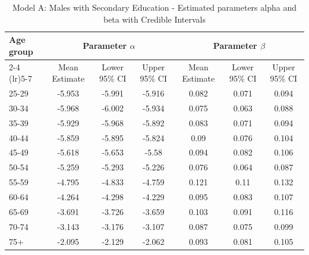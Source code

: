\begin{landscape}
\begin{table}[htbp]
\centering
\caption{Model A: Males with Secondary Education - Estimated parameters alpha and beta  with Credible Intervals}
\label{tab:parameters_ab7}
\begin{tabular}{@{}lcccccc@{}}
\toprule
Age group & \multicolumn{3}{c}{Parameter \(\alpha\)} & \multicolumn{3}{c}{Parameter \(\beta\)} \\ 
\cmidrule(lr){2-4} \cmidrule(lr){5-7}
          & Mean Estimate & Lower 95\% CI & Upper 95\% CI & Mean Estimate & Lower 95\% CI & Upper 95\% CI \\ 
\midrule
25-29 & -5.953 & -5.991 & -5.916 & 0.082 & 0.071 & 0.094 \\
30-34 & -5.968 & -6.002 & -5.934 & 0.075 & 0.063 & 0.088 \\
35-39 & -5.929 & -5.968 & -5.892 & 0.083 & 0.071 & 0.094 \\
40-44 & -5.859 & -5.895 & -5.824 & 0.09 & 0.076 & 0.104 \\
45-49 & -5.618 & -5.653 & -5.58 & 0.094 & 0.082 & 0.106 \\
50-54 & -5.259 & -5.293 & -5.226 & 0.076 & 0.064 & 0.087 \\
55-59 & -4.795 & -4.833 & -4.759 & 0.121 & 0.11 & 0.132 \\
60-64 & -4.264 & -4.298 & -4.229 & 0.095 & 0.083 & 0.107 \\
65-69 & -3.691 & -3.726 & -3.659 & 0.103 & 0.091 & 0.116 \\
70-74 & -3.143 & -3.176 & -3.107 & 0.087 & 0.075 & 0.099 \\
75+ & -2.095 & -2.129 & -2.062 & 0.093 & 0.081 & 0.105 \\
\bottomrule
\end{tabular}
\end{table}
\end{landscape}